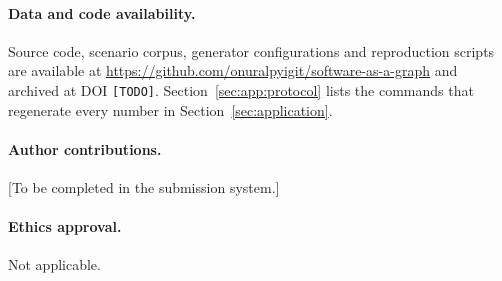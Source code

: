 \paragraph{Data and code availability.} Source code, scenario corpus, generator configurations and reproduction scripts are available at \url{https://github.com/onuralpyigit/software-as-a-graph} and archived at DOI \texttt{[TODO]}. Section~\ref{sec:app:protocol} lists the commands that regenerate every number in Section~\ref{sec:application}.

\paragraph{Author contributions.} [To be completed in the submission system.]

\paragraph{Ethics approval.} Not applicable.
